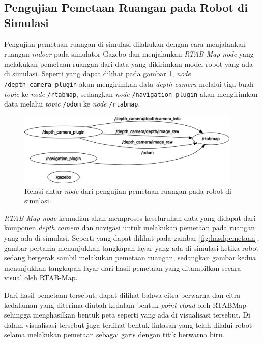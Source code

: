 \subsection{Pengujian Pemetaan Ruangan pada Robot di Simulasi}
\label{subsec:slamsimulasi}

Pengujian pemetaan ruangan di simulasi dilakukan dengan cara menjalankan ruangan \emph{indoor} pada simulator Gazebo dan menjalankan \emph{RTAB-Map node} yang melakukan pemetaan ruangan dari data yang dikirimkan model robot yang ada di simulasi.
Seperti yang dapat dilihat pada gambar \ref{fig:rosgraphslamsimulation},
  \emph{node} \lstinline{/depth_camera_plugin} akan mengirimkan data \emph{depth camera} melalui tiga buah \emph{topic} ke \emph{node} \lstinline{/rtabmap},
  sedangkan \emph{node} \lstinline{/navigation_plugin} akan mengirimkan data melalui \emph{topic} \lstinline{/odom} ke \emph{node} \lstinline{/rtabmap}.

\begin{figure}[ht]
  \centering
  \includegraphics[width=0.95\textwidth,keepaspectratio]{gambar/rosgraph-slam-simulation.png}
  \caption{Relasi antar-\emph{node} dari pengujian pemetaan ruangan pada robot di simulasi.}
  \label{fig:rosgraphslamsimulation}
\end{figure}

\emph{RTAB-Map node} kemudian akan memproses keseluruhan data yang didapat dari komponen \emph{depth camera} dan navigasi untuk melakukan pemetaan pada ruangan yang ada di simulasi.
Seperti yang dapat dilihat pada gambar \ref{fig:hasilpemetaan},
  gambar pertama menunjukkan tangkapan layar yang ada di simulasi ketika robot sedang bergerak sambil melakukan pemetaan ruangan,
  sedangkan gambar kedua menunjukkan tangkapan layar dari hasil pemetaan yang ditampilkan secara visual oleh RTAB-Map.

Dari hasil pemetaan tersebut,
  dapat dilihat bahwa citra berwarna dan citra kedalaman yang diterima diubah kedalam bentuk \emph{point cloud} oleh RTABMap sehingga menghasilkan bentuk peta seperti yang ada di visualisasi tersebut.
Di dalam visualisasi tersebut juga terlihat bentuk lintasan yang telah dilalui robot selama melakukan pemetaan sebagai garis dengan titik berwarna biru.

